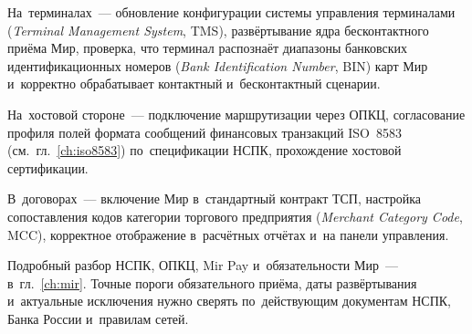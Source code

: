 На~терминалах~--- обновление конфигурации системы управления терминалами
(\textit{Terminal Management System}, TMS), развёртывание ядра бесконтактного приёма
Мир, проверка, что терминал распознаёт диапазоны банковских идентификационных
номеров (\textit{Bank Identification Number}, BIN) карт Мир и~корректно обрабатывает
контактный и~бесконтактный сценарии.

На~хостовой стороне~--- подключение маршрутизации через ОПКЦ, согласование профиля полей формата сообщений
финансовых транзакций ISO~8583 (см.~гл.~\ref{ch:iso8583}) по~спецификации НСПК,
прохождение хостовой сертификации.

В~договорах~--- включение Мир в~стандартный контракт ТСП, настройка
сопоставления кодов категории торгового предприятия (\textit{Merchant Category
Code}, MCC), корректное отображение в~расчётных отчётах и~на панели управления.

Подробный разбор НСПК, ОПКЦ, Mir Pay и~обязательности Мир~---
в~гл.~\ref{ch:mir}. Точные пороги обязательного приёма, даты развёртывания
и~актуальные исключения нужно сверять по~действующим документам НСПК, Банка
России и~правилам сетей.
